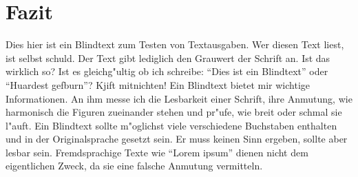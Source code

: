 \section{Fazit}%
\label{sec:fazit} 

Dies hier ist ein Blindtext zum Testen von Textausgaben. Wer diesen Text liest, ist selbst
schuld. Der Text gibt lediglich den Grauwert der Schrift an. Ist das wirklich so? Ist es
gleichg"ultig ob ich schreibe: ``Dies ist ein Blindtext'' oder ``Huardest gefburn''? Kjift 
mitnichten! Ein Blindtext bietet mir wichtige Informationen. An ihm messe ich die Lesbarkeit 
einer Schrift, ihre Anmutung, wie harmonisch die Figuren zueinander stehen
und pr"ufe, wie breit oder schmal sie l"auft. Ein Blindtext sollte m"oglichst viele 
verschiedene Buchstaben enthalten und in der Originalsprache gesetzt sein. Er muss keinen
Sinn ergeben, sollte aber lesbar sein. Fremdsprachige Texte wie ``Lorem ipsum'' dienen nicht 
dem eigentlichen Zweck, da sie eine falsche Anmutung vermitteln.
